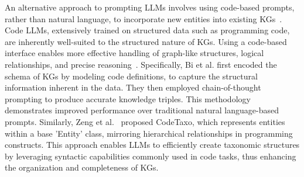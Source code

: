 An alternative approach to prompting LLMs involves using code-based prompts,  rather than natural language, to incorporate new entities into existing KGs~\cite{bi2024codekgc,zeng2024codetaxo}. 
Code LLMs, extensively trained on structured data such as programming code, are inherently well-suited to the structured nature of KGs.
Using a code-based interface enables more effective handling of graph-like structures, logical relationships, and precise reasoning~\cite{madaan2022language,chen2023program,shi2024agent}.
Specifically, Bi et al. \cite{bi2024codekgc} first encoded the schema of KGs by modeling code definitions, to capture the structural information inherent in the data. They then employed chain-of-thought prompting to produce accurate knowledge triples. This methodology demonstrates improved performance over traditional natural language-based prompts. 
Similarly, Zeng et al.~\citep{zeng2024codetaxo} proposed CodeTaxo, which represents entities within a base 'Entity' class, mirroring hierarchical relationships in programming constructs. This approach enables LLMs to efficiently create taxonomic structures by leveraging syntactic capabilities commonly used in code tasks, thus enhancing the organization and completeness of KGs. 


